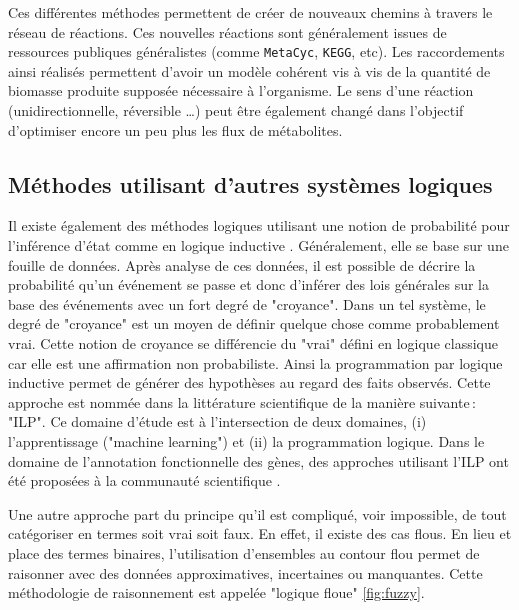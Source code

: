 \begin{refsegment}
    Ces différentes méthodes permettent de créer de nouveaux chemins à travers le réseau de réactions. Ces nouvelles réactions sont généralement issues de ressources publiques généralistes (comme \texttt{MetaCyc}, \texttt{KEGG}, etc). Les raccordements ainsi réalisés permettent d'avoir un modèle cohérent vis à vis de la quantité de biomasse produite supposée nécessaire à l'organisme. Le sens d'une réaction (unidirectionnelle, réversible \ldots) peut être également changé dans l'objectif d'optimiser encore un peu plus les flux de métabolites.
    
    \subsection{Méthodes utilisant d'autres systèmes logiques }
    
    Il existe également des méthodes logiques utilisant une notion de probabilité pour l'inférence d'état comme en logique inductive \cite{michalski1983theory,muggleton1994inductive}. Généralement, elle se base sur une fouille de données. Après analyse de ces données, il est possible de décrire la probabilité qu'un événement se passe et donc d'inférer des lois générales sur la base des événements avec un fort degré de "croyance". Dans un tel système, le degré de "croyance" est un moyen de définir quelque chose comme probablement vrai. Cette notion de croyance se différencie du "vrai" défini en logique classique car elle est une affirmation non probabiliste. Ainsi la programmation par logique inductive permet de générer des hypothèses au regard des faits observés. Cette approche est nommée dans la littérature scientifique de la manière suivante : "\gls{ILP}". Ce domaine d'étude est à l'intersection de deux domaines, (i) l'apprentissage ("machine learning") et (ii) la programmation logique. Dans le domaine de l'annotation fonctionnelle des gènes, des approches utilisant l'\gls{ILP} ont été proposées à la communauté scientifique \cite{clare2003predicting,king2004applying}.
    
    Une autre approche part du principe qu'il est compliqué, voir impossible, de tout catégoriser en termes soit vrai soit faux. En effet, il existe des cas flous. En lieu et place des termes binaires, l'utilisation d'ensembles au contour flou permet de raisonner avec des données approximatives, incertaines ou manquantes. Cette méthodologie de raisonnement est appelée "logique floue" \ref{fig:fuzzy}.
        

\end{refsegment}
